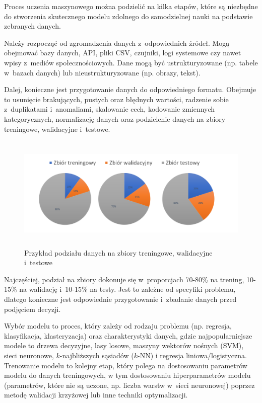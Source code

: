 Proces uczenia maszynowego można podzielić na kilka etapów,
które są niezbędne do stworzenia skutecznego modelu zdolnego do samodzielnej nauki na podstawie zebranych danych.

Należy rozpocząć od zgromadzenia danych z~odpowiednich źródeł.
Mogą obejmować bazy danych, API, pliki CSV, czujniki, logi systemowe czy nawet wpisy z~mediów społecznościowych.
Dane mogą być ustrukturyzowane (np. tabele w~bazach danych) lub nieustrukturyzowane (np. obrazy, tekst).

Dalej, konieczne jest przygotowanie danych do odpowiedniego formatu.
Obejmuje to usunięcie brakujących, pustych oraz błędnych wartości,
radzenie sobie z~duplikatami i~anomaliami, skalowanie cech, kodowanie zmiennych kategorycznych,
normalizację danych oraz podzielenie danych na zbiory treningowe, walidacyjne i~testowe.

\begin{figure}[ht]
	\centering
	\includegraphics[height=5.5cm]{resources/machine-learning/images/process_1.png}
	\caption{Przykład podziału danych na zbiory treningowe, walidacyjne i~testowe}
    \label{Fig:ml-process-1}
\end{figure}
\FloatBarrier

Najczęściej, podział na zbiory dokonuje się w~proporcjach 70-80\% na trening, 10-15\% na walidację i~10-15\% na testy.
Jest to zależne od specyfiki problemu,
dlatego konieczne jest odpowiednie przygotowanie i~zbadanie danych przed podjęciem decyzji.

Wybór modelu to proces, który zależy od rodzaju problemu (np. regresja, klasyfikacja, klasteryzacja)
oraz charakterystyki danych, gdzie najpopularniejsze modele to drzewa decyzyjne,
lasy losowe, maszyny wektorów nośnych (SVM), sieci neuronowe, $k$-najbliższych sąsiadów ($k$-NN)
i regresja liniowa/logistyczna. Trenowanie modelu to kolejny etap,
który polega na dostosowaniu parametrów modelu do danych treningowych,
w tym dostosowaniu hiperparametrów modelu (parametrów, które nie są uczone,
np. liczba warstw w~sieci neuronowej) poprzez metodę walidacji krzyżowej lub inne techniki optymalizacji.

